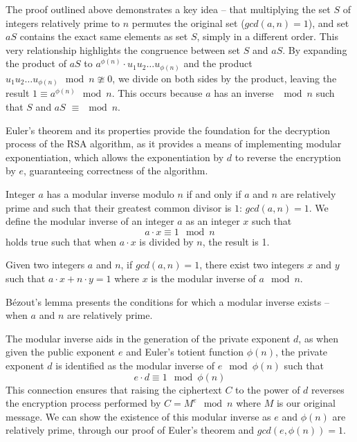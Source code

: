 \documentclass{article}
\begin{document}
The proof outlined above demonstrates a key idea – that multiplying the set $S$ of integers relatively prime to $n$ permutes the original set ($gcd(a, n) = 1$), and set $aS$ contains the exact same elements as set $S$, simply in a different order. This very relationship highlights the congruence between set $S$ and $aS$. By expanding the product of $aS$ to $a^{\phi(n)}\cdot u_1u_2 \ldots u_{\phi(n)}$ and the product $u_1u_2 \ldots u_{\phi(n)} \mod n \ncong 0$, we divide on both sides by the product, leaving the result $1 \equiv a^{\phi(n)} \mod n$. This occurs because $a$ has an inverse $\mod n$ such that $S$ and $aS$  $\equiv \mod n$. 

Euler's theorem and its properties provide the foundation for the decryption process of the RSA algorithm, as it provides a means of implementing modular exponentiation, which allows the exponentiation by $d$ to reverse the encryption by $e$, guaranteeing correctness of the algorithm.
\begin{tcolorbox} [colback=purple!5!white, colframe=purple!40!white, title=\textbf{Definition (Modular Inverse)}]
Integer $a$ has a modular inverse modulo $n$ if and only if $a$ and $n$ are relatively prime and such that their greatest common divisor is $1$: $gcd(a, n) = 1$. We define the modular inverse of an integer $a$ as an integer $x$ such that
\begin{equation}
a \cdot x \equiv 1 \mod n
\end{equation}
holds true such that when $a \cdot x$ is divided by $n$, the result is 1.    
\end{tcolorbox}

\begin{tcolorbox} [colback=gray!5!white, colframe=gray!40!white, title=\textbf{Corollary 2.2.1 (Bézout's Lemma)}]
Given two integers $a$ and $n$, if $gcd(a, n) = 1$, there exist two integers $x$ and $y$ such that $a \cdot x + n \cdot y = 1$ where $x$ is the modular inverse of $a \mod n$. 
\end{tcolorbox}

Bézout's lemma presents the conditions for which a modular inverse exists – when $a$ and $n$ are relatively prime.

The modular inverse aids in the generation of the private exponent $d$, as when given the public exponent $e$ and Euler's totient function $\phi(n)$, the private exponent $d$ is identified as the modular inverse of $e \mod \phi(n)$ such that
\begin{equation}
e \cdot d \equiv 1 \mod \phi(n)
\end{equation}
This connection ensures that raising the ciphertext $C$ to the power of $d$ reverses the encryption process performed by $C = M^e \mod n$ where $M$ is our original message. We can show the existence of this modular inverse as $e$ and $\phi(n)$ are relatively prime, through our proof of Euler's theorem and $gcd(e, \phi(n)) = 1$.
\end{document}
